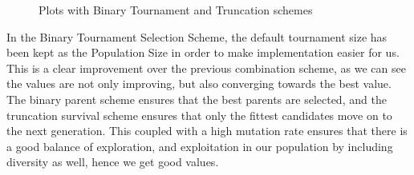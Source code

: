 \documentclass{article}
\theoremstyle{mytheoremstyle}
\theoremstyle{mytheoremstyle}
\theoremstyle{myproblemstyle}
\begin{document}
\begin{figure}[H]
\begin{tabular}{| c | c |}
    \end{tabular}
    \begin{center}
        \caption{Plots with Binary Tournament and Truncation schemes}
    \end{center}
\end{figure}

In the Binary Tournament Selection Scheme, the default tournament size has been kept as the Population Size in order to make implementation easier for us. This is a clear improvement over the previous combination scheme, as we can see the values are not only improving, but also converging towards the best value. The binary parent scheme ensures that the best parents are selected, and the truncation survival scheme ensures that only the fittest candidates move on to the next generation. This coupled with a high mutation rate ensures that there is a good balance of exploration, and exploitation in our population by including diversity as well, hence we get good values.
\end{document}
